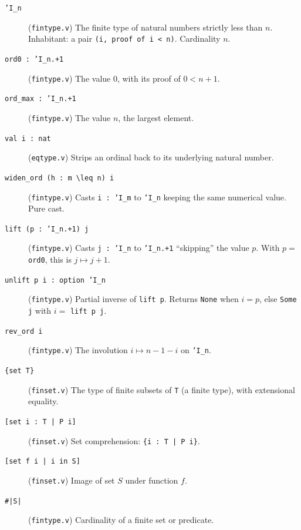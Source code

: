 \begin{description}
  \item[\texttt{'I\_n}] (\texttt{fintype.v}) The finite type of
    natural numbers strictly less than $n$. Inhabitant: a pair
    \texttt{(i, proof of i\,<\,n)}. Cardinality $n$.

  \item[\texttt{ord0\,:\,'I\_n.+1}] (\texttt{fintype.v}) The value
    $0$, with its proof of $0 < n+1$.

  \item[\texttt{ord\_max\,:\,'I\_n.+1}] (\texttt{fintype.v}) The
    value $n$, the largest element.

  \item[\texttt{val\,i\,:\,nat}] (\texttt{eqtype.v}) Strips an
    ordinal back to its underlying natural number.

  \item[\texttt{widen\_ord (h\,:\,m\,\textbackslash leq\,n) i}]
    (\texttt{fintype.v}) Casts \texttt{i\,:\,'I\_m} to \texttt{'I\_n}
    keeping the same numerical value. Pure cast.

  \item[\texttt{lift (p\,:\,'I\_n.+1) j}] (\texttt{fintype.v})
    Casts \texttt{j\,:\,'I\_n} to \texttt{'I\_n.+1} ``skipping''
    the value $p$. With $p = $ \texttt{ord0}, this is $j \mapsto j+1$.

  \item[\texttt{unlift p i\,:\,option 'I\_n}] (\texttt{fintype.v})
    Partial inverse of \texttt{lift p}. Returns \texttt{None} when
    $i = p$, else \texttt{Some j} with $i = $ \texttt{lift p j}.

  \item[\texttt{rev\_ord i}] (\texttt{fintype.v}) The involution
    $i \mapsto n - 1 - i$ on \texttt{'I\_n}.

  \item[\texttt{\{set T\}}] (\texttt{finset.v}) The type of finite
    subsets of \texttt{T} (a finite type), with extensional equality.

  \item[\texttt{[set i\,:\,T\,|\,P i]}] (\texttt{finset.v}) Set
    comprehension: \texttt{\{i\,:\,T\,|\,P i\}}.

  \item[\texttt{[set f i\,|\,i in S]}] (\texttt{finset.v}) Image of
    set $S$ under function $f$.

  \item[\texttt{\#|S|}] (\texttt{fintype.v}) Cardinality of a finite
    set or predicate.


\end{description}
